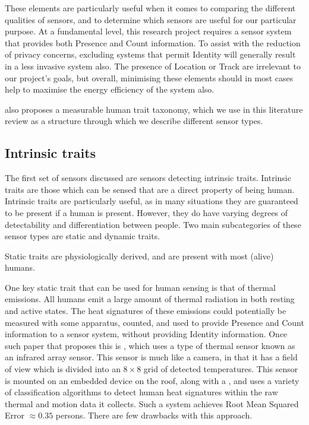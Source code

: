 \documentclass[../thesis/thesis.tex]{subfiles}
\begin{document}
These elements are particularly useful when it comes to comparing the different qualities of sensors, and to determine which sensors are useful for our particular purpose. At a fundamental level, this research project requires a sensor system that provides both Presence and Count information. To assist with the reduction of privacy concerns, excluding systems that permit Identity will generally result in a less invasive system also. The presence of Location or Track are irrelevant to our project's goals, but overall, minimising these elements should in most cases help to maximise the energy efficiency of the system also.

\cite{teixeira2010survey} also proposes a measurable human trait taxonomy, which we use in this literature review as a structure through which we describe different sensor types.

\subsection{Intrinsic traits}
\label{subsec:litreview:sensors:intrinsic}

The first set of sensors discussed are sensors detecting intrinsic traits. Intrinsic traits are those which can be sensed that are a direct property of being human. Intrinsic traits are particularly useful, as in many situations they are guaranteed to be present if a human is present. However, they do have varying degrees of detectability and differentiation between people. Two main subcategories of these sensor types are static and dynamic traits.

Static traits are physiologically derived, and are present with most (alive) humans.

One key static trait that can be used for human sensing is that of thermal emissions. All humans emit a large amount of thermal radiation in both resting and active states. The heat signatures of these emissions could potentially be measured with some apparatus, counted, and used to provide Presence and Count information to a sensor system, without providing Identity information. Once such paper that proposes this is \cite{beltran2013thermosense}, which uses a type of thermal sensor known as an infrared array sensor. This sensor is much like a camera, in that it has a field of view which is divided into an $8\times8$ grid of detected temperatures. This sensor is mounted on an embedded device on the roof, along with a \pir, and uses a variety of classification algorithms to detect human heat signatures within the raw thermal and motion data it collects. Such a system achieves Root Mean Squared Error $\approx0.35$ persons. There are few drawbacks with this approach.
\end{document}
